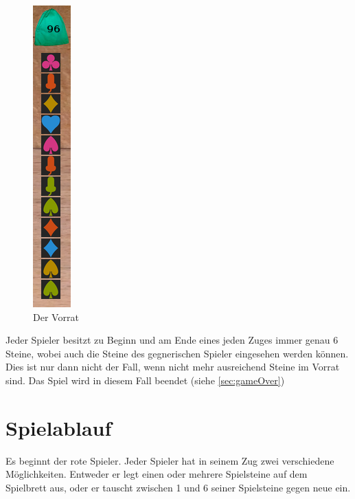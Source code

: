 \documentclass[a4paper, ngerman]{scrartcl}
\begin{document}
\begin{figure}[h] \centering 
	\includegraphics[scale = 0.7]{images/Vorratsbeutel}
	\caption{Der Vorrat}
	\label{fig:Vorrat2}
\end{figure}
Jeder Spieler besitzt zu Beginn und am Ende eines jeden Zuges immer genau 6 Steine, wobei auch die Steine des gegnerischen Spieler eingesehen werden können. Dies ist nur dann nicht der Fall, wenn nicht mehr ausreichend Steine im Vorrat sind. Das Spiel wird in diesem Fall beendet (siehe \autoref{sec:gameOver})\\


\section{Spielablauf}		
	Es beginnt der rote Spieler. Jeder Spieler hat in seinem Zug zwei verschiedene Möglichkeiten. Entweder er legt einen oder mehrere Spielsteine auf dem Spielbrett aus, oder er tauscht zwischen 1 und 6 seiner Spielsteine gegen neue ein.	
	
\end{document}
